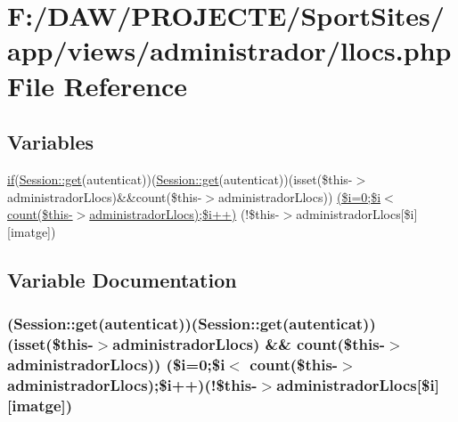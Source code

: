 \hypertarget{llocs_8php}{}\section{F\+:/\+D\+A\+W/\+P\+R\+O\+J\+E\+C\+T\+E/\+Sport\+Sites/app/views/administrador/llocs.php File Reference}
\label{llocs_8php}
\subsection*{Variables}
\begin{DoxyCompactItemize}
\item 
\hyperlink{app_2views_2index_2index_8php_af71ebd4d252438a1590e85e150ce8954}{if}(\hyperlink{class_session_acf4e501ef0dfb6e98762fbecc9d75b9a}{Session\+::get}(\textquotesingle{}autenticat\textquotesingle{}))(\hyperlink{class_session_acf4e501ef0dfb6e98762fbecc9d75b9a}{Session\+::get}(\textquotesingle{}autenticat\textquotesingle{}))(isset(\$this-\/$>$administrador\+Llocs)\&\&count(\$this-\/$>$administrador\+Llocs)) \hyperlink{llocs_8php_a653061f0ee1a503d9becf18b1f684e74}{(\$i=0;\$i$<$ count(\$this-\/$>$administrador\+Llocs);\$i++)} (!\$this-\/$>$administrador\+Llocs\mbox{[}\$i\mbox{]}\mbox{[}\textquotesingle{}imatge\textquotesingle{}\mbox{]})
\end{DoxyCompactItemize}


\subsection{Variable Documentation}
\hypertarget{llocs_8php_a653061f0ee1a503d9becf18b1f684e74}{}
\subsubsection[{(\$i=0;\$i$<$ count(\$this-\/$>$administrador\+Llocs);\$i++)}]{({\bf Session\+::get}(\textquotesingle{}autenticat\textquotesingle{}))({\bf Session\+::get}(\textquotesingle{}autenticat\textquotesingle{}))(isset(\$this-\/$>$administrador\+Llocs) \&\& count(\$this-\/$>$administrador\+Llocs)) (\$i=0;\$i$<$ count(\$this-\/$>$administrador\+Llocs);\$i++)(!\$this-\/$>$administrador\+Llocs\mbox{[}\$i\mbox{]}\mbox{[}\textquotesingle{}imatge\textquotesingle{}\mbox{]})}\label{llocs_8php_a653061f0ee1a503d9becf18b1f684e74}
